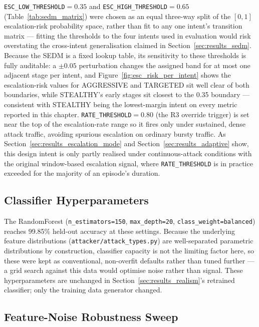 \texttt{ESC\_LOW\_THRESHOLD}$=0.35$ and \texttt{ESC\_HIGH\_THRESHOLD}$=0.65$
(Table~\ref{tab:sedm_matrix}) were chosen as an equal three-way split of the
$[0,1]$ escalation-risk probability space, rather than fit to any one
intent's transition matrix — fitting the thresholds to the four intents
used in evaluation would risk overstating the cross-intent generalisation
claimed in Section~\ref{sec:results_sedm}. Because the SEDM is a fixed
lookup table, its sensitivity to these thresholds is fully auditable: a
$\pm 0.05$ perturbation changes the assigned band for at most one adjacent
stage per intent, and Figure~\ref{fig:esc_risk_per_intent} shows the
escalation-risk values for AGGRESSIVE and TARGETED sit well clear of both
boundaries, while STEALTHY's early stages sit closest to the 0.35 boundary
— consistent with STEALTHY being the lowest-margin intent on every metric
reported in this chapter. \texttt{RATE\_THRESHOLD}$=0.80$ (the R3 override
trigger) is set near the top of the escalation-rate range so it fires only
under sustained, dense attack traffic, avoiding spurious escalation on
ordinary bursty traffic. As Section~\ref{sec:results_escalation_mode} and
Section~\ref{sec:results_adaptive} show, this design intent is only partly
realised under continuous-attack conditions with the original window-based
escalation signal, where \texttt{RATE\_THRESHOLD} is in practice exceeded
for the majority of an episode's duration.

\subsection{Classifier Hyperparameters}

The RandomForest (\texttt{n\_estimators=150}, \texttt{max\_depth=20},
\texttt{class\_weight=\textquotesingle balanced\textquotesingle}) reaches 99.85\% held-out
accuracy at these settings. Because the underlying feature distributions
(\texttt{attacker/attack\_types.py}) are well-separated parametric
distributions by construction, classifier capacity is not the limiting
factor here, so these were kept as conventional, non-overfit defaults
rather than tuned further — a grid search against this data would optimise
noise rather than signal. These hyperparameters are unchanged in
Section~\ref{sec:results_realism}'s retrained classifier; only the training
data generator changed.

\subsection{Feature-Noise Robustness Sweep}

